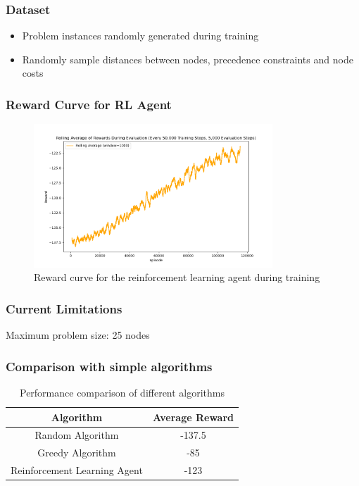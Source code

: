 \documentclass{beamer}
\begin{document}
\begin{frame}
    \frametitle{Dataset}
    \begin{itemize}
        \item Problem instances randomly generated during training
        \item Randomly sample distances between nodes, precedence constraints and node costs
    \end{itemize}
\end{frame}


\begin{frame}
    \frametitle{Reward Curve for RL Agent}
    \begin{figure}
        \centering
        \includegraphics[width=0.8\textwidth]{reward_trajectory.png}
        \caption{Reward curve for the reinforcement learning agent during training}
    \end{figure}
\end{frame}

\begin{frame}
\frametitle{Current Limitations}
Maximum problem size: 25 nodes

\end{frame}

\begin{frame}
    \frametitle{Comparison with simple algorithms}
    \begin{table}[]
        \centering
        \begin{tabular}{|c|c|}
            \hline
            \textbf{Algorithm} & \textbf{Average Reward} \\
            \hline
            Random Algorithm & -137.5 \\  %
            \hline
            Greedy Algorithm & -85 \\
            \hline
            Reinforcement Learning Agent & -123 \\
            \hline
        \end{tabular}
        \caption{Performance comparison of different algorithms}
    \end{table}
\end{frame}
\end{document}
